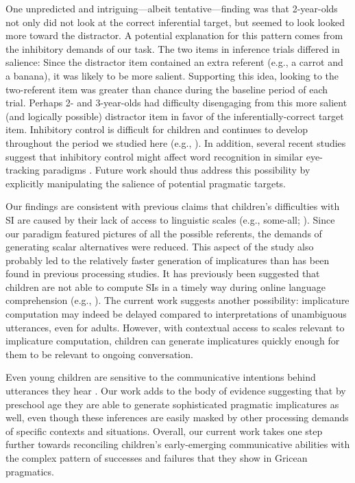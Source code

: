 \documentclass[10pt,letterpaper]{article}
\begin{document}
One unpredicted and intriguing---albeit tentative---finding was that 2-year-olds not only did not look at the correct inferential target, but seemed to look looked more toward the distractor. A potential explanation for this pattern comes from the inhibitory demands of our task. The two items in inference trials differed in salience: Since the distractor item contained an extra referent (e.g., a carrot and a banana), it was likely to be more salient. Supporting this idea, looking to the two-referent item was greater than chance during the baseline period of each trial. Perhaps 2- and 3-year-olds had difficulty disengaging from this more salient (and logically possible) distractor item in favor of the inferentially-correct target item. Inhibitory control is difficult for children and continues to develop throughout the period we studied here (e.g.,  ). In addition, several recent studies suggest that inhibitory control might affect word recognition in similar eye-tracking paradigms \cite{yurovskybeyond,nordmeyer2013measuring}. Future work should thus address this possibility by explicitly manipulating the salience of potential pragmatic targets.

Our findings are consistent with previous claims that children's difficulties with SI are caused by their lack of access to linguistic scales (e.g., some-all; ). Since our paradigm featured pictures of all the possible referents, the demands of generating scalar alternatives were reduced. This aspect of the study also probably led to the relatively faster generation of implicatures than has been found in previous processing studies. It has previously been suggested that children are not able to compute SIs in a timely way during online language comprehension (e.g., ). The current work suggests another possibility: implicature computation may indeed be delayed compared to interpretations of unambiguous utterances, even for adults. However, with contextual access to scales relevant to implicature computation, children can generate implicatures quickly enough for them to be relevant to ongoing conversation. 

Even young children are sensitive to the communicative intentions behind utterances they hear \cite{clark2009first,baldwin1993early}. Our work adds to the body of evidence suggesting that by preschool age they are able to generate sophisticated pragmatic implicatures as well, even though these inferences are easily masked by other processing demands of specific contexts and situations. Overall, our current work takes one step further towards reconciling children's early-emerging communicative abilities with the complex pattern of successes and failures that they show in Gricean pragmatics.
\end{document}

